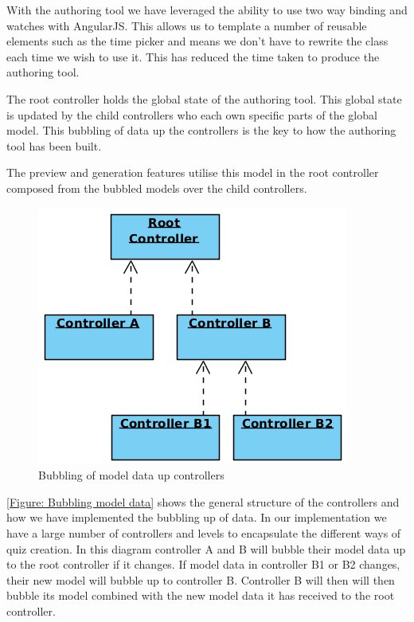 With the authoring tool we have leveraged the ability to use two way binding and watches with AngularJS. This allows us to template a number of reusable elements such as the time picker and means we don't have to rewrite the class each time we wish to use it. This has reduced the time taken to produce the authoring tool.

The root controller holds the global state of the authoring tool. This global state is updated by the child controllers who each own specific parts of the global model. This bubbling of data up the controllers is the key to how the authoring tool has been built.

The preview and generation features utilise this model in the root controller composed from the bubbled models over the child controllers.

\begin{figure}[h]
	\centering
		\includegraphics[scale=0.4]{../figures/authoring_tool/controller_bubbling.png} 		
	\caption{\label{Figure: Bubbling model data} Bubbling of model data up controllers} 	
\end{figure}

\autoref{Figure: Bubbling model data} shows the general structure of the controllers and how we have implemented the bubbling up of data. In our implementation we have a large number of controllers and levels to encapsulate the different ways of quiz creation. In this diagram controller A and B will bubble their model data up to the root controller if it changes. If model data in controller B1 or B2 changes, their new model will bubble up to controller B. Controller B will then will then bubble its model combined with the new model data it has received to the root controller.

